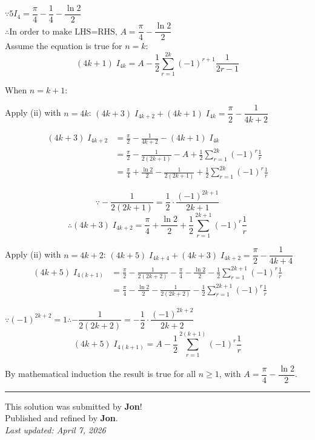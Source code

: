 \documentclass[12pt]{article}
\begin{document}
$\because 5I_4=\dfrac{\pi}{4} - \dfrac{1}{4} - \dfrac{\ln 2}{2}$\\
$\therefore \text{In order to make LHS=RHS, } A=\dfrac{\pi}{4} - \dfrac{\ln 2}{2}$\\

Assume the equation is true for $n=k$:
$$(4k+1)\;I_{4k}=A-\frac{1}{2}\displaystyle\sum_{r=1}^{2k}\left(-1\right)^{r+1}\frac{1}{2r-1}$$


When $n=k+1$:

Apply (ii) with $n=4k$: \quad $(4k+3)\;I_{4k+2}+(4k+1)\;I_{4k}=\dfrac{\pi}{2}-\dfrac{1}{4k+2}$

\begin{align*}
(4k+3)\;I_{4k+2} &= \frac{\pi}{2}-\frac{1}{4k+2}-(4k+1)\;I_{4k}\\
&= \frac{\pi}{2}-\frac{1}{2(2k+1)}-A+\frac{1}{2}\sum_{r=1}^{2k}(-1)^r\frac{1}{r}\\
&= \frac{\pi}{4}+\frac{\ln 2}{2}-\frac{1}{2(2k+1)}+\frac{1}{2}\sum_{r=1}^{2k}(-1)^r\frac{1}{r}
\end{align*}

$$\because -\dfrac{1}{2(2k+1)}=\dfrac{1}{2}\cdot\dfrac{(-1)^{2k+1}}{2k+1}$$
$$\boxed{\therefore (4k+3)\;I_{4k+2}=\frac{\pi}{4}+\frac{\ln 2}{2}+\frac{1}{2}\sum_{r=1}^{2k+1}(-1)^r\frac{1}{r}}$$

Apply (ii) with $n=4k+2$: \quad $(4k+5)\;I_{4k+4}+(4k+3)\;I_{4k+2}=\dfrac{\pi}{2}-\dfrac{1}{4k+4}$
\begin{align*}
(4k+5)\;I_{4(k+1)} &= \frac{\pi}{2}-\frac{1}{2(2k+2)}-\frac{\pi}{4}-\frac{\ln 2}{2}-\frac{1}{2}\sum_{r=1}^{2k+1}(-1)^r\frac{1}{r}\\
&= \frac{\pi}{4}-\frac{\ln 2}{2}-\frac{1}{2(2k+2)}-\frac{1}{2}\sum_{r=1}^{2k+1}(-1)^r\frac{1}{r}
\end{align*}

$\because (-1)^{2k+2}=1$\qquad $\therefore-\dfrac{1}{2(2k+2)}=-\dfrac{1}{2}\cdot\dfrac{(-1)^{2k+2}}{2k+2}$
$$(4k+5)\;I_{4(k+1)}=A-\frac{1}{2}\sum_{r=1}^{2(k+1)}(-1)^r\frac{1}{r}$$

By mathematical induction the result is true for all $n\geqslant 1$, with $\boxed{A=\dfrac{\pi}{4}-\dfrac{\ln 2}{2}}$.

\newpage
\hrule
\begin{center}
    This solution was submitted by \textbf{Jon}!\\[4pt]
    Published and refined by \textbf{Jon}.\\[8pt]
    \textit{Last updated: April 7, 2026}
\end{center}
\end{document}
